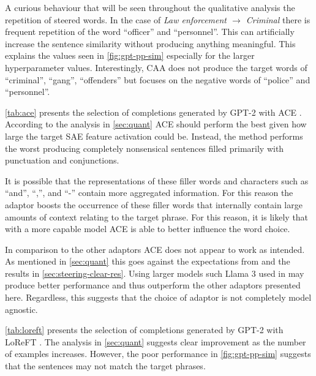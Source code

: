 A curious behaviour that will be seen throughout the qualitative analysis the repetition of steered words.
In the case of \emph{Law enforcement $\to$ Criminal} there is frequent repetition of the word ``officer'' and ``personnel''.
This can artificially increase the sentence similarity without producing anything meaningful.
This explains the values seen in \cref{fig:gpt-pp-sim} especially for the larger hyperparameter values.
Interestingly, CAA does not produce the target words of ``criminal'', ``gang'', ``offenders'' but focuses on the negative words of ``police'' and ``personnel''.




\cref{tab:ace} presents the selection of completions generated by GPT-2 with ACE \citep{ace}.
According to the analysis in \cref{sec:quant} ACE should perform the best given how large the target SAE feature activation could be.
Instead, the method performs the worst producing completely nonsensical sentences filled primarily with punctuation and conjunctions.

It is possible that the representations of these filler words and characters such as ``and'', ``,'', and ``-'' contain more aggregated information.
For this reason the adaptor boosts the occurrence of these filler words that internally contain large amounts of context relating to the target phrase.
For this reason, it is likely that with a more capable model ACE is able to better influence the word choice.

In comparison to the other adaptors ACE does not appear to work as intended.
As mentioned in \cref{sec:quant} this goes against the expectations from \citet{ace} and the results in \cref{sec:steering-clear-res}.
Using larger models such Llama 3 \citep{llama3} used in \citet{ace} may produce better performance and thus outperform the other adaptors presented here.
Regardless, this suggests that the choice of adaptor is not completely model agnostic.




\cref{tab:loreft} presents the selection of completions generated by GPT-2 with LoReFT \citep{reft}.
The analysis in \cref{sec:quant} suggests clear improvement as the number of examples increases.
However, the poor performance in \cref{fig:gpt-pp-sim} suggests that the sentences may not match the target phrases.

